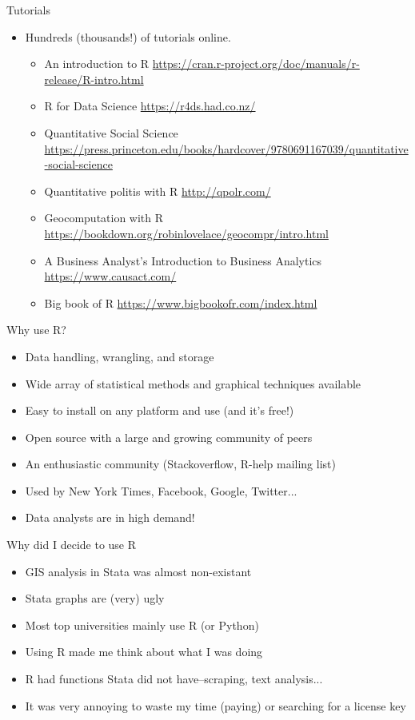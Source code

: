 \documentclass{beamer}
\begin{document}
\begin{frame}{Tutorials}
\begin{itemize}[<+->]
\item Hundreds (thousands!) of tutorials online.
\begin{itemize}
\item An introduction to R \url{https://cran.r-project.org/doc/manuals/r-release/R-intro.html}
\item R for Data Science \url{https://r4ds.had.co.nz/}
\item Quantitative Social Science \url{https://press.princeton.edu/books/hardcover/9780691167039/quantitative-social-science}
\item Quantitative politis with R \url{http://qpolr.com/}
\item Geocomputation with R \url{https://bookdown.org/robinlovelace/geocompr/intro.html}
\item A Business Analyst's Introduction to Business Analytics \url{https://www.causact.com/}
\item Big book of R  \url{https://www.bigbookofr.com/index.html}
\end{itemize}
 \end{itemize} 
\end{frame}


\begin{frame}{Why use R?}
\begin{itemize}[<+->]
\item Data handling, wrangling, and storage
\item Wide array of statistical methods and graphical techniques available
\item Easy to install on any platform and use (and it’s free!)
\item Open source with a large and growing community of peers
\item An enthusiastic community (Stackoverflow, R-help mailing list)
\item Used by New York Times, Facebook, Google, Twitter...
\item Data analysts are in high demand!
 \end{itemize} 
\end{frame}

\begin{frame}{Why did I decide to use R}
\begin{itemize}[<+->]
\item GIS analysis in Stata was almost non-existant
\item Stata graphs are (very) ugly
\item Most top universities mainly use R (or Python)
\item Using R made me think about what I was doing
\item R had functions Stata did not have--scraping, text analysis...
\item It was very annoying to waste my time (paying) or searching for a license key
 \end{itemize} 
\end{frame}
\end{document}
